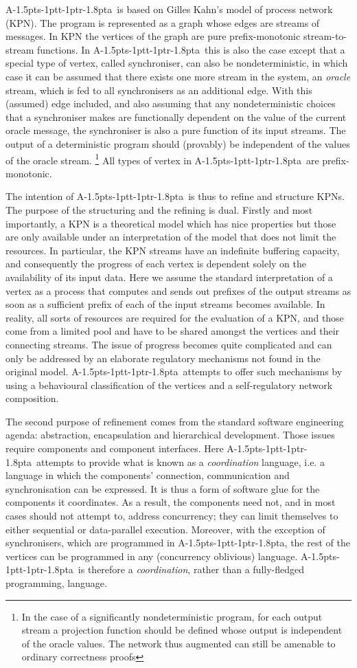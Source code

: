 \documentclass[11pt]{report}
\def\ak{{\textsf{A\kern-1.5pts\kern-1ptt\kern-1ptr\kern-1.8pta}}\kern-2pt{\it K\kern-2ptahn}}
\begin{document}
\ak\ is based on Gilles Kahn's model of process network (KPN). The program is represented as a graph whose edges are
streams of messages. In KPN the vertices of the graph are pure prefix-monotonic stream-to-stream functions. In \ak\ this
is also the case except that a special type of vertex, called synchroniser, can also be nondeterministic, in which case it can be
assumed that there exists one more stream in the system, an {\em oracle} stream, which is fed to all synchronisers as an additional
edge. With this (assumed) edge  included, and also assuming that any nondeterministic choices that a synchroniser makes are functionally
dependent on the value of the current oracle message, the synchroniser is also a pure function of its input streams.
The output of a deterministic program should (provably) be independent of the values of
the oracle stream. \footnote{In the case of a significantly nondeterministic program, for each output stream a projection
function should be defined whose output is independent of the oracle values. The network thus augmented can still be amenable
to ordinary correctness proofs} All types of vertex in \ak\ are prefix-monotonic.

The intention of \ak\ is thus to refine and structure KPNs. The purpose of the structuring and the refining is dual. Firstly and
most importantly, a KPN is a theoretical model which has nice properties but those are only available under an interpretation of
the model that does not limit the resources. In particular, the KPN streams have an indefinite buffering capacity, and consequently
the progress of each vertex is dependent solely on the availability of its input data. Here we assume the standard interpretation of
a vertex as a process that computes and sends out prefixes of the output streams as soon as a sufficient prefix of each of the input streams
becomes available.  In reality, all sorts of resources are required for the evaluation of a KPN, and those come from a limited
pool and have to be shared amongst the vertices and their connecting streams. The issue of progress becomes quite complicated
and can only be addressed by an elaborate regulatory mechanisms not found in the original model. \ak\ attempts to offer
such mechanisms by using a behavioural classification of the vertices and a self-regulatory network composition.

The second purpose of refinement comes from the standard software engineering agenda: abstraction, encapsulation and
hierarchical development. Those issues require components and component interfaces. Here \ak\ attempts to provide what
is known as a {\em coordination} language, i.e. a language in which the components' connection, communication and synchronisation
can be expressed. It is thus a form of software glue for the components it coordinates. As a result, the components need not,
and in most cases should not attempt to, address concurrency; they can limit themselves to either sequential or data-parallel
execution. Moreover, with the exception of synchronisers, which are programmed in \ak, the rest of the vertices can be programmed
in any (concurrency oblivious)  language. \ak\ is therefore a {\em coordination}, rather than a fully-fledged programming,
language.
\end{document}
